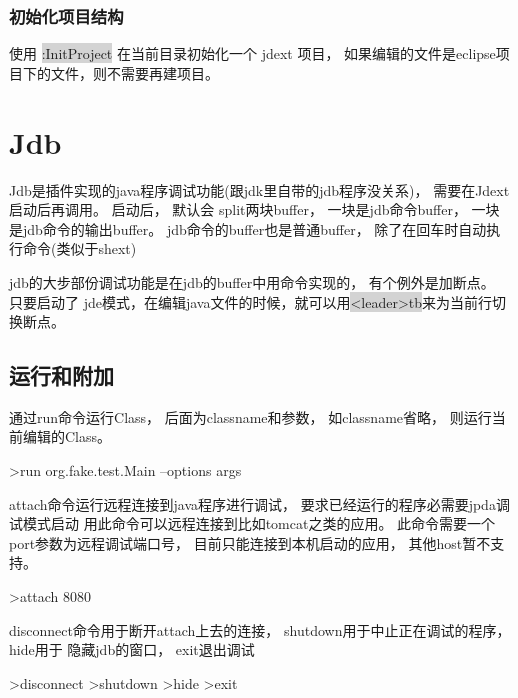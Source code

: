 \documentclass[oneside,openany]{book}
\begin{document}
\subsubsection{初始化项目结构}
使用 \colorbox{lightgray}{:InitProject} 在当前目录初始化一个 jdext 项目， 如果编辑的文件是eclipse项目下的文件，则不需要再建项目。 

\section{Jdb}
    Jdb是插件实现的java程序调试功能(跟jdk里自带的jdb程序没关系)， 需要在Jdext启动后再调用。 启动后， 默认会 
    split两块buffer， 一块是jdb命令buffer， 一块是jdb命令的输出buffer。 jdb命令的buffer也是普通buffer， 除了在回车时自动执行命令(类似于shext) 

    jdb的大步部份调试功能是在jdb的buffer中用命令实现的， 有个例外是加断点。 只要启动了
    jde模式，在编辑java文件的时候，就可以用\colorbox{lightgray}{<leader>tb}来为当前行切换断点。

  \subsection{运行和附加}
    
    通过run命令运行Class， 后面为classname和参数， 如classname省略， 则运行当前编辑的Class。
    \begin{mdframed}[style=SmallFrame]
    \begin{flushleft}
    >run org.fake.test.Main --options args
    \end{flushleft}
    \end{mdframed}
    \vspace{4mm}

    attach命令运行远程连接到java程序进行调试， 要求已经运行的程序必需要jpda调试模式启动
    用此命令可以远程连接到比如tomcat之类的应用。 此命令需要一个port参数为远程调试端口号， 
    目前只能连接到本机启动的应用， 其他host暂不支持。
    \begin{mdframed}[style=SmallFrame]
    \begin{flushleft}
    >attach 8080              
    \end{flushleft}
    \end{mdframed}
    \vspace{4mm}

    disconnect命令用于断开attach上去的连接， shutdown用于中止正在调试的程序， hide用于
    隐藏jdb的窗口， exit退出调试 
    \begin{mdframed}[style=SmallFrame]
     \begin{flushleft}
    >disconnect\newline
    >shutdown\newline
    >hide\newline
    >exit                      
    \end{flushleft}
    \end{mdframed}
    \vspace{5mm}
\end{document}
